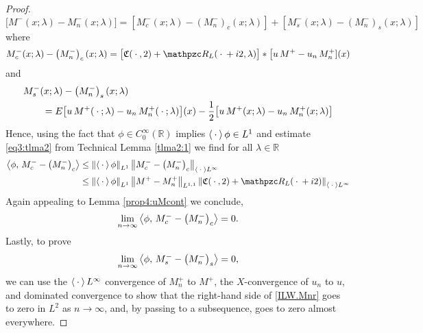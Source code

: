 \documentclass[../dissertation.tex]{subfiles}
\begin{document}
\begin{proof}
	\[
		\big[M^-(x;\lambda)- M_n^-(x;\lambda)\big]
			= \left[M^-_c(x;\lambda) - \left( M_n^- \right)_c(x;\lambda)\right] 
				+ \left[M^-_s(x;\lambda) - \left( M_n^- \right)_s(x;\lambda)\right]
	\]
	where
	\begin{align}
		 M^-_c(x;\lambda) - \left( M_n^- \right)_c(x;\lambda)
			= 
				\big[ 
					\mathfrak C(\dotarg, 2) + \mathpzc R_L(\dotarg+i2, \lambda)
				\big] 
				*
				\big[u\,M^+ - u_n\,M_n^+](x)
	\end{align}
	and
	\begin{align}\label{ILW.Mnr}
		 &M^-_s(x;\lambda) - \left( M_n^- \right)_s(x;\lambda) \\
			&\qquad= 
				E\big[u\,M^+(\kern 0.5ex \cdot \kern 0.5ex;\lambda)- u_n\,M_n^+(\kern 0.5ex \cdot \kern 0.5ex;\lambda)\big](x)
				- \frac{1}{2} \big[u\,M^+(x;\lambda)- u_n\,M_n^+(x;\lambda)\big]
	\end{align}
	Hence, using the fact that $\phi \in C_0^\infty(\mathbb R)$ implies 
	$\left\langle \kern 0.5ex \cdot \kern 0.5ex \right\rangle \phi \in L^1$ and estimate \eqref{eq3:tlma2} from 
	Technical Lemma \ref{tlma2:1} we find for all $\lambda \in \mathbb R$
	\begin{align*}
		\inn{\phi, \, M^-_c - \left( M_n^- \right)_c }
			&\leq \nm{\inn{\dotarg} \phi }_{L^1} 
				\nm{M^-_c - \left( M_n^- \right)_c}_{\inn{\dotarg} L^\infty} 
				\\
			&\leq \nm{\inn{\dotarg} \phi }_{L^1}
				\nm{M^+ - M_n^+}_{L^{1,1}} 
				\nm{\mathfrak C(\dotarg, 2) + \mathpzc R_L(\dotarg + i2)}_{\inn{\dotarg}L^\infty}
	\end{align*}
	Again appealing to Lemma \ref{prop4:uMcont} we conclude,  
	\begin{align*}
		\lim_{n\to\infty} \left\langle \phi, \, M^-_c - \left( M_n^- \right)_c  \right\rangle = 0.
	\end{align*}
	Lastly, to prove
	\begin{align*}
		\lim_{n\to\infty} \left\langle \phi, \, M^-_s - \left( M_n^- \right)_s \right\rangle
			= 0,
	\end{align*}
	we can use the $\left\langle \kern 0.5ex \cdot \kern 0.5ex \right\rangle L^\infty$ convergence of $M_n^+$ to $M^+$, the $X$-convergence 
	of $u_n$ to $u$, and dominated convergence to show that the right-hand side of 
	\eqref{ILW.Mnr} goes to zero in $L^2$ as $n \to \infty$, and, by passing to a 
	subsequence, goes to zero almost everywhere. 
\end{proof}




\label{lastpagePenultimateSection}
\end{document}
